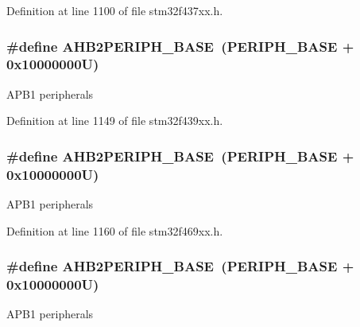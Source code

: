 Definition at line 1100 of file stm32f437xx.\+h.

\subsubsection[{\texorpdfstring{A\+H\+B2\+P\+E\+R\+I\+P\+H\+\_\+\+B\+A\+SE}{AHB2PERIPH_BASE}}]{\setlength{\rightskip}{0pt plus 5cm}\#define A\+H\+B2\+P\+E\+R\+I\+P\+H\+\_\+\+B\+A\+SE~({\bf P\+E\+R\+I\+P\+H\+\_\+\+B\+A\+SE} + 0x10000000\+U)}\hypertarget{group___peripheral__memory__map_gaeedaa71d22a1948492365e2cd26cfd46}{}\label{group___peripheral__memory__map_gaeedaa71d22a1948492365e2cd26cfd46}
A\+P\+B1 peripherals 

Definition at line 1149 of file stm32f439xx.\+h.

\subsubsection[{\texorpdfstring{A\+H\+B2\+P\+E\+R\+I\+P\+H\+\_\+\+B\+A\+SE}{AHB2PERIPH_BASE}}]{\setlength{\rightskip}{0pt plus 5cm}\#define A\+H\+B2\+P\+E\+R\+I\+P\+H\+\_\+\+B\+A\+SE~({\bf P\+E\+R\+I\+P\+H\+\_\+\+B\+A\+SE} + 0x10000000\+U)}\hypertarget{group___peripheral__memory__map_gaeedaa71d22a1948492365e2cd26cfd46}{}\label{group___peripheral__memory__map_gaeedaa71d22a1948492365e2cd26cfd46}
A\+P\+B1 peripherals 

Definition at line 1160 of file stm32f469xx.\+h.

\subsubsection[{\texorpdfstring{A\+H\+B2\+P\+E\+R\+I\+P\+H\+\_\+\+B\+A\+SE}{AHB2PERIPH_BASE}}]{\setlength{\rightskip}{0pt plus 5cm}\#define A\+H\+B2\+P\+E\+R\+I\+P\+H\+\_\+\+B\+A\+SE~({\bf P\+E\+R\+I\+P\+H\+\_\+\+B\+A\+SE} + 0x10000000\+U)}\hypertarget{group___peripheral__memory__map_gaeedaa71d22a1948492365e2cd26cfd46}{}\label{group___peripheral__memory__map_gaeedaa71d22a1948492365e2cd26cfd46}
A\+P\+B1 peripherals 

